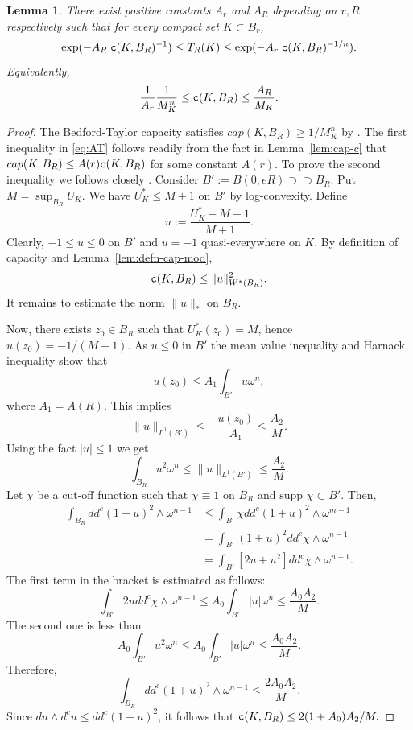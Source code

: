 \documentclass{amsart}
\newcommand{\om}{\omega}
\newcommand{\tc}{{\tt c}}
\newcommand{\supp}{\mbox{supp }}
\newtheorem{lem}[thm]{Lemma}
\theoremstyle{definition}
\numberwithin{thm}{section}
\numberwithin{equation}{section}
\renewcommand{\[}{\begin{equation}}
\renewcommand{\]}{\end{equation}}
\newcommand{\wed}{\wedge}
\begin{document}
\begin{lem} \label{lem:AT-type} There exist positive constants $A_r$ and $A_R$ depending on $r,R$ respectively such that for every compact  set $K\subset B_r$,
$$ \exp(- A_R \; \tc (K,B_R)^{-1}) \leq  T_R(K) \leq 	\exp(- A_r\;\tc (K, B_R)^{-1/n}).
$$ 
Equivalently,
\[\label{eq:AT}
	\frac{1}{A_r} \frac{1}{M_K^n} \leq \tc (K,B_R) \leq \frac{A_R }{M_K}.
\]
\end{lem}

\begin{proof}  
The Bedford-Taylor capacity satisfies $cap(K, B_R) \geq 1/M_K^n$ by \cite[Theorem~2.1]{AT84}. The first inequality in \eqref{eq:AT} follows readily from the fact in Lemma~\ref{lem:cap-c}  that
$cap(K,B_R) \leq A(r) \tc (K,B_R)$ for some constant $A(r)$. To prove the second inequality we follows closely \cite[Theorem~11.1]{De89}. Consider $B':= B(0, eR)  \supset\supset B_R$. Put  $M= \sup_{B_R} U_K$. We have $U_K^* \leq M+ 1$ on $B'$ by log-convexity. Define
 $$u := \frac{U_K^*-M-1}{M+1}.$$
Clearly, $-1\leq u \leq 0$ on $B'$ and $u =-1$  quasi-everywhere on $K$. 
By definition of capacity and Lemma~\ref{lem:defn-cap-mod},
$$
	\tc(K,B_R) \leq  \|  u\|_{W^*(B_R)}^2.
$$
It remains to estimate the norm $\|u\|_*$ on $B_R$. 

Now, there exists $z_0\in \bar B_R$ such that $U_K^*(z_0) =M$, hence $u(z_0) = -1/(M+1)$. 
As $u \leq 0$ in $B'$ the mean value inequality and Harnack inequality show that
$$
	u(z_0) \leq A_1 \int_{B'} u \om^n,
$$
where $A_1 = A(R)$. This implies 
$$
	\|u\|_{L^1(B')} \leq -\frac{u(z_0)}{A_1} \leq \frac{A_2}{M}.
$$
Using the fact $|u|\leq 1$ we get
$$
	 \int_{B_R} u^2 \om^n \leq \|u\|_{L^1(B')}\leq \frac{A_2}{M}.
$$
Let $\chi$ be a cut-off function such that $\chi \equiv 1$ on $B_R$ and $\supp\chi \subset B'$. Then,
$$\begin{aligned}
	\int_{B_R} dd^c (1+u)^2\wed \om^{n-1} 
&\leq  \int_{B'} \chi dd^c (1+u)^2\wed \om^{m-1} \\
&= \int_{B'} (1+ u)^2 dd^c \chi\wed \om^{n-1} \\
&= \int_{B'} [2u+u^2] dd^c \chi \wed\om^{n-1}.
\end{aligned}$$
The first term in the bracket is estimated  as follows:
$$
	\int_{B'} 2u dd^c \chi \wed \om^{n-1} \leq A_0 \int_{B'} |u| \om^n \leq \frac{A_0 A_2}{M}. 
$$
The second one is  less than
$$
	A_0 \int_{B'} u^2 \om^{n} \leq A_0 \int_{B'} |u| \om^n \leq \frac{A_0 A_2}{M}.
$$
Therefore,
$$
	\int_{B_R} dd^c (1+u)^2 \wed \om^{n-1}	\leq \frac{2A_0A_2}{M}.
$$
Since 
$
du \wed d^c u \leq dd^c (1+u)^2
$, it follows that $\tc (K,B_R) \leq 2(1+A_0) A_2/M.$
\end{proof}
\end{document}
